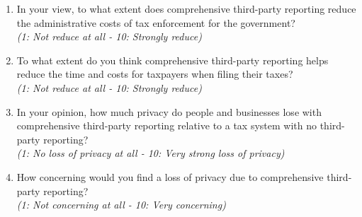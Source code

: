 \documentclass[11pt]{article}
\begin{document}
\begin{enumerate}[resume]
\item In your view, to what extent does comprehensive third-party reporting reduce the administrative costs of tax enforcement for the government?\\
\textit{(1: Not reduce at all - 10: Strongly reduce)}

\item To what extent do you think comprehensive third-party reporting helps reduce the time and costs for taxpayers when filing their taxes?\\
\textit{(1: Not reduce at all - 10: Strongly reduce)}
    \item In your opinion, how much privacy do people and businesses lose with comprehensive third-party reporting relative to a tax system with no third-party reporting?\\
    \textit{(1: No loss of privacy at all - 10: Very strong loss of privacy)}
    \item How concerning would you find a loss of privacy due to comprehensive third-party reporting?\\
    \textit{(1: Not concerning at all - 10: Very concerning)}
\end{enumerate}
\end{document}
